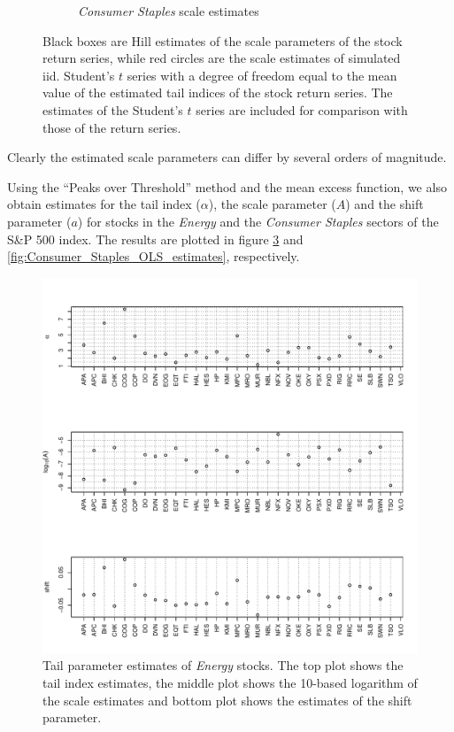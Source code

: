\documentclass{article}
\newcommand{\1}[1]{
  \mathbf{1}_{\{#1\}}
}
\begin{document}
\begin{figure}[htb!]
\begin{subfigure}{0.45\textwidth}
    \caption{{\it Consumer Staples} scale estimates}    
    \label{fig:Consumer_Staples_Hill_Scales}
  \end{subfigure}
  \caption{Black boxes are Hill estimates of the scale parameters of
    the stock return series, while red circles are the scale estimates
    of simulated iid. Student's $t$ series with a degree of freedom
    equal to the mean value of the estimated tail indices of the stock
    return series. The estimates of the Student's $t$ series are
    included for comparison with those of the return series.}
\end{figure}
Clearly the estimated scale parameters can differ by several orders of
magnitude. 

Using the ``Peaks over Threshold'' method and the mean excess
function, we also obtain estimates for the tail index ($\alpha$), the
scale parameter ($A$) and the shift parameter ($a$) for stocks in the
{\it Energy} and the {\it Consumer Staples} sectors of the S\&P 500
index. The results are plotted in figure
\ref{fig:Energy_OLS_estimates} and
\ref{fig:Consumer_Staples_OLS_estimates},
respectively.
\begin{figure}[htb!]
  \includegraphics[width=\textwidth]{Energy_OLS_estimates.pdf}
  \caption{Tail parameter estimates of {\it Energy} stocks. The top
    plot shows the tail index estimates, the middle plot shows the
    10-based logarithm of the scale estimates and bottom plot shows
    the estimates of the shift parameter.
  }
  \label{fig:Energy_OLS_estimates}
\end{figure}
\end{document}
